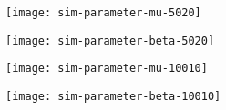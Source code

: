 \documentclass{svproc}
\begin{document}
\begin{figure}[H]
\begin{center}
\texttt{[image: sim-parameter-mu-5020]}
\label{plot12}
\end{center}
\end{figure}

\begin{figure}[H]
\begin{center}
\texttt{[image: sim-parameter-beta-5020]}
\label{plot13}
\end{center}
\end{figure}

\begin{figure}[H]
\begin{center}
\texttt{[image: sim-parameter-mu-10010]}
\label{plot14}
\end{center}
\end{figure}

\begin{figure}[H]
\begin{center}
\texttt{[image: sim-parameter-beta-10010]}
\label{plot15}
\end{center}
\end{figure}
\end{document}
